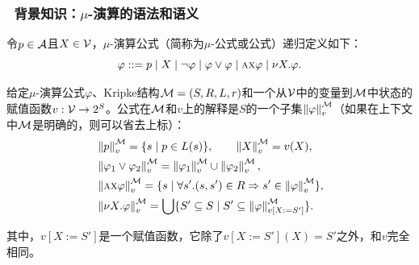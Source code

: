 \documentclass[aspectratio=1610, 9pt, CJK]{beamer}
\begin{document}
\begin{frame} 
	\frametitle{~背景知识：$\mu$-演算的语法和语义}
		\begin{definition}[$\mu$-演算公式]
			令$p\in {\cal A}$且$X\in {\cal V}$，$\mu$-演算公式（简称为$\mu$-公式或公式）递归定义如下：
			\[
			\varphi ::=   p\mid  X\mid \neg \varphi\mid \varphi \vee \varphi \mid \textsc{a}\textsc{x} \varphi\mid  \nu X. \varphi.
			\]
		\end{definition}
		\begin{definition}[$\mu$-演算的语义]
			给定$\mu$-演算公式$\varphi$、Kripke结构{\em ${\cal M}=(S,R,L,r)$}和一个从${\cal V}$中的变量到${\cal M}$中状态的赋值函数$v: {\cal V} \rightarrow 2^S$。公式在${\cal M}$和$v$上的解释是$S$的一个子集$\left\| \varphi\right\|_v^{{\cal M}}$（如果在上下文中${\cal M}$是明确的，则可以省去上标）：
				\begin{align*}
					& \left \| p\right \|_v^{{\cal M}} = \{s\mid p \in L(s)\}, \qquad \left\| X\right\|_v^{{\cal M}} = v(X),\\
					& \left\|\varphi_1 \vee \varphi_2\right\|_v^{{\cal M}} = \left\|\varphi_1\right\|_v^{{\cal M}} \cup \left\|\varphi_2\right\|_v^{{\cal M}},\\ 
					& \left\|\textsc{a} \textsc{x} \varphi\right\|_v^{{\cal M}} = \{s\mid \forall s'. (s, s') \in R \Rightarrow s' \in \left\|\varphi\right\|_v^{{\cal M}}\},\\ 
					& \left\| \nu X. \varphi\right\|_v^{{\cal M}} = \bigcup\{S' \subseteq S \mid S' \subseteq \left\|\varphi\right\|_{v[X:= S']}^{{\cal M}}\}.
				\end{align*}
			
			其中，$v[X:= S']$是一个赋值函数，它除了$v[X:= S'](X)=S'$之外，和$v$完全相同。
		\end{definition}
		
\end{frame}
\end{document}
